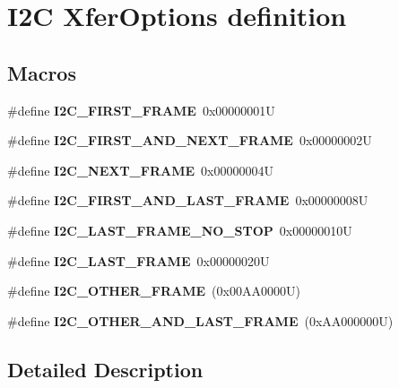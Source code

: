 \hypertarget{group___i2_c___xfer_options__definition}{}\section{I2C Xfer\+Options definition}
\label{group___i2_c___xfer_options__definition}
\subsection*{Macros}
\begin{DoxyCompactItemize}
\item 
\mbox{\label{group___i2_c___xfer_options__definition_gab23601bfc0eaddbc4823d193b7e49a9c}} 
\#define {\bfseries I2\+C\+\_\+\+F\+I\+R\+S\+T\+\_\+\+F\+R\+A\+ME}~0x00000001U
\item 
\mbox{\label{group___i2_c___xfer_options__definition_ga1396d7236a5e1d52c9fd6d182d1f2869}} 
\#define {\bfseries I2\+C\+\_\+\+F\+I\+R\+S\+T\+\_\+\+A\+N\+D\+\_\+\+N\+E\+X\+T\+\_\+\+F\+R\+A\+ME}~0x00000002U
\item 
\mbox{\label{group___i2_c___xfer_options__definition_ga8790cd8bea154c662fc6a6d6ef6b9083}} 
\#define {\bfseries I2\+C\+\_\+\+N\+E\+X\+T\+\_\+\+F\+R\+A\+ME}~0x00000004U
\item 
\mbox{\label{group___i2_c___xfer_options__definition_ga56aa81e0fe6ff902f3b0dd0bc9e11b96}} 
\#define {\bfseries I2\+C\+\_\+\+F\+I\+R\+S\+T\+\_\+\+A\+N\+D\+\_\+\+L\+A\+S\+T\+\_\+\+F\+R\+A\+ME}~0x00000008U
\item 
\mbox{\label{group___i2_c___xfer_options__definition_gac316c2c562991d4629151b517c2c02d8}} 
\#define {\bfseries I2\+C\+\_\+\+L\+A\+S\+T\+\_\+\+F\+R\+A\+M\+E\+\_\+\+N\+O\+\_\+\+S\+T\+OP}~0x00000010U
\item 
\mbox{\label{group___i2_c___xfer_options__definition_gaf732cc5827622242ce14645f67749f40}} 
\#define {\bfseries I2\+C\+\_\+\+L\+A\+S\+T\+\_\+\+F\+R\+A\+ME}~0x00000020U
\item 
\mbox{\label{group___i2_c___xfer_options__definition_gabedde3791be7cb544ffeb9e408d1980e}} 
\#define {\bfseries I2\+C\+\_\+\+O\+T\+H\+E\+R\+\_\+\+F\+R\+A\+ME}~(0x00\+A\+A0000\+U)
\item 
\mbox{\label{group___i2_c___xfer_options__definition_ga272995b7f02a1e44b589cc9794093d0b}} 
\#define {\bfseries I2\+C\+\_\+\+O\+T\+H\+E\+R\+\_\+\+A\+N\+D\+\_\+\+L\+A\+S\+T\+\_\+\+F\+R\+A\+ME}~(0x\+A\+A000000\+U)
\end{DoxyCompactItemize}


\subsection{Detailed Description}
